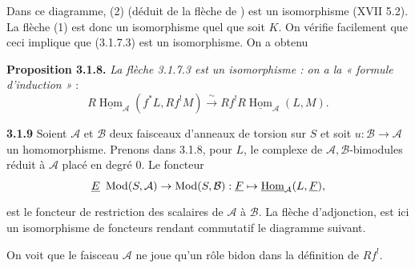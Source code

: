 \documentclass[11pt,a4paper]{article}
\begin{document}


 Dans ce diagramme, (2) (déduit de la flèche de
 ) est un isomorphisme (XVII 5.2).
La flèche (1) est donc un isomorphisme quel que soit $K$. On vérifie
facilement que ceci implique que (3.1.7.3) est un isomorphisme. On a obtenu

\textbf{Proposition 3.1.8.} \emph{La flèche 3.1.7.3 est un isomorphisme : on a
la « formule d'induction »} :
\[
R\underline{\operatorname{Hom}}_{\mathcal{A}}(f^{*}L, Rf^{!}M) \xrightarrow{\ \sim\ } Rf^{!} R\underline{\operatorname{Hom}}_{\mathcal{A}}(L, M).
\]

\textbf{3.1.9} Soient $\mathcal{A}$ et $\mathcal{B}$  deux
faisceaux d'anneaux de torsion sur $S$ et soit $u : \mathcal{B} \to
\mathcal{A}$ un homomorphisme. Prenons dans 3.1.8, pour $L$, le complexe de
$\mathcal{A},\mathcal{B}$-bimodules  réduit à
$\mathcal{A}$ placé en degré 0. Le foncteur
\[
\struck{E}\ \operatorname{Mod}(S, \mathcal{A}) \to \operatorname{Mod}(S, \mathcal{B}) : \underline{F} \mapsto \underline{\operatorname{Hom}}_{\mathcal{A}}(L, \underline{F}),
\]
est le foncteur de restriction des scalaires  de $\mathcal{A}$ à
$\mathcal{B}$. La flèche d'adjonction, est ici un isomorphisme de foncteurs
rendant commutatif le diagramme suivant.



On voit que le faisceau $\mathcal{A}$ ne joue qu'un rôle bidon dans la
définition de $Rf^{!}$.

\end{document}

